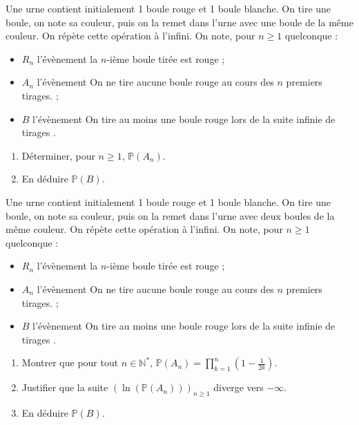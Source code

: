 \documentclass[../PolyS4.tex]{subfiles}
\begin{document}
Une urne contient initialement 1 boule rouge et 1 boule blanche. On tire une boule, on note sa couleur, puis on la remet dans l'urne avec une boule de la même couleur. On répète cette opération à l'infini. On note, pour $n \geq 1$ quelconque :
\begin{itemize}
    \item $R_n$ l'évènement \og  la $n$-ième boule tirée est rouge \fg{}  ;
    \item $A_n$ l'évènement \og  On ne tire aucune boule rouge au cours des $n$ premiers tirages. \fg{}  ;
    \item $B$ l'évènement \og  On tire au moins une boule rouge lors de la suite infinie de tirages \fg{} .
\end{itemize}
\begin{enumerate}
    \item Déterminer, pour $n \geq 1$, $\mathbb{P}(A_n)$.
    \item En déduire $\mathbb{P}(B)$.\\
\end{enumerate}




Une urne contient initialement 1 boule rouge et 1 boule blanche. On tire une boule, on note sa couleur, puis on la remet dans l'urne avec deux boules de la même couleur. On répète cette opération à l'infini. On note, pour $n \geq 1$ quelconque :\\
\begin{itemize}
    \item $R_n$ l'évènement \og  la $n$-ième boule tirée est rouge \fg{}  ;
    \item $A_n$ l'évènement \og  On ne tire aucune boule rouge au cours des $n$ premiers tirages. \fg{}  ;
    \item $B$ l'évènement \og  On tire au moins une boule rouge lors de la suite infinie de tirages \fg{} .
\end{itemize}
\begin{enumerate}
    \item Montrer que pour tout $n \in \mathbb{N}^*$, $\mathbb{P}(A_n) = \prod_{k=1}^{n} \left(1 - \frac{1}{2k}\right)$.
    \item Justifier que la suite $(\ln(\mathbb{P}(A_n)))_{n \geq 1}$ diverge vers $-\infty$.
    \item En déduire $\mathbb{P}(B)$.\\
\end{enumerate}
\end{document}
